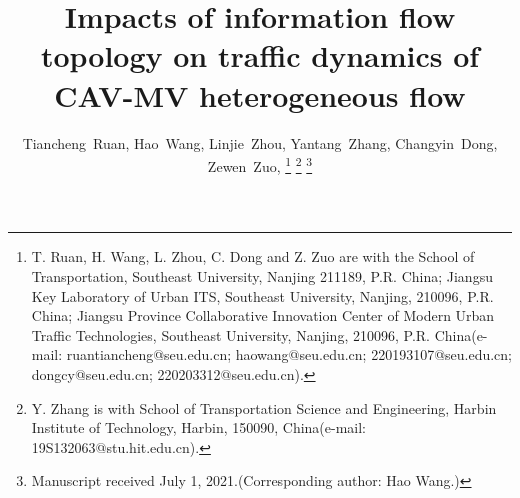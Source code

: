 \documentclass[journal]{IEEEtran}
\begin{document}
%
\title{Impacts of information flow topology on traffic dynamics of CAV-MV heterogeneous flow}
%
%
%

\author{Tiancheng~Ruan,
        Hao~Wang,
        Linjie~Zhou,
        Yantang~Zhang,
        Changyin~Dong,
        Zewen~Zuo,
\thanks{T. Ruan,  H. Wang, L. Zhou, C. Dong and Z. Zuo are with the
School of Transportation, Southeast University, Nanjing 211189, P.R. China;
Jiangsu Key Laboratory of Urban ITS, Southeast University, Nanjing, 210096, P.R. China;
Jiangsu Province Collaborative Innovation Center of Modern Urban Traffic Technologies, Southeast University, Nanjing, 210096, P.R. China(e-mail: ruantiancheng@seu.edu.cn;  haowang@seu.edu.cn; 220193107@seu.edu.cn;
dongcy@seu.edu.cn; 220203312@seu.edu.cn).}%
\thanks{Y. Zhang is with School of Transportation Science and Engineering, Harbin Institute of Technology, Harbin, 150090,  China(e-mail: 19S132063@stu.hit.edu.cn).}%
\thanks{Manuscript received July 1, 2021.(Corresponding author: Hao Wang.)}}

% 
%
\end{document}
